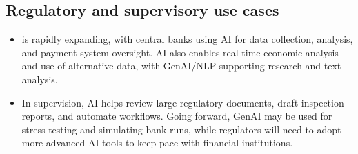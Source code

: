 \subsection*{Regulatory and supervisory use cases}

\begin{itemize}
\item {} is rapidly expanding, with central
banks using AI for data collection, analysis, and payment system oversight. AI also enables
real-time economic analysis and use of alternative data, with GenAI/NLP supporting research
and text analysis.
\item In supervision, AI helps review large regulatory documents, draft inspection reports,
and automate workflows. Going forward, GenAI may be used for stress testing and simulating
bank runs, while regulators will need to adopt more advanced AI tools to keep pace with
financial institutions.
\end{itemize}

